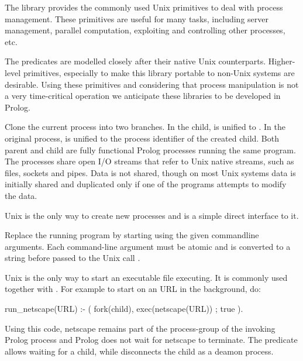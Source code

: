 \documentclass[11pt]{article}
\begin{document}
The  library provides the commonly used Unix primitives to
deal with process management. These primitives are useful for many
tasks, including server management, parallel computation, exploiting and
controlling other processes, etc.

The predicates are modelled closely after their native Unix
counterparts. Higher-level primitives, especially to make this library
portable to non-Unix systems are desirable. Using these primitives and
considering that process manipulation is not a very time-critical
operation we anticipate these libraries to be developed in Prolog.

\begin{description}
Clone the current process into two branches. In the child,  is
unified to . In the original process,  is unified
to the process identifier of the created child.  Both parent and child
are fully functional Prolog processes running the same program.  The
processes share open I/O streams that refer to Unix native streams, such
as files, sockets and pipes. Data is not shared, though on most Unix
systems data is initially shared and duplicated only if one of the
programs attempts to modify the data.

Unix  is the only way to create new processes and 
is a simple direct interface to it.

Replace the running program by starting  using the given
commandline arguments. Each command-line argument must be atomic and is
converted to a string before passed to the Unix call .

Unix  is the only way to start an executable file
executing.  It is commonly used together with .  For example to
start  on an URL in the background, do:

\begin{code}
run_netscape(URL) :-
        (    fork(child),
             exec(netscape(URL))
        ;    true
        ).
\end{code}

\noindent
Using this code, netscape remains part of the process-group of the
invoking Prolog process and Prolog does not wait for netscape to
terminate.  The predicate  allows waiting for a child, while
 disconnects the child as a deamon process.


\end{description}
\end{document}
